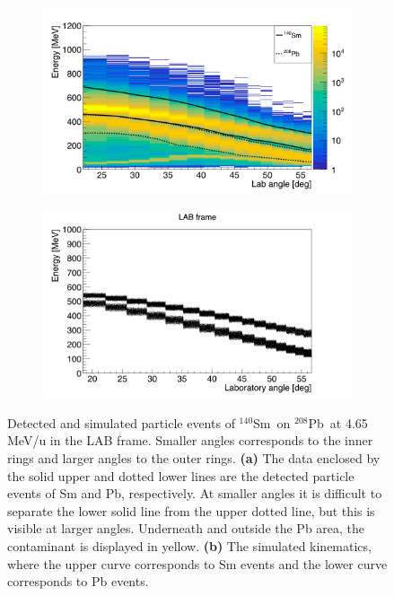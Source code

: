 \documentclass[twoside,english]{uiofysmaster/uiofysmaster}
\newcommand{\Sm}{$^{140}$Sm} %
\newcommand{\Pb}{$^{208}$Pb}
\begin{document}
\begin{figure}[htb]
	\centering
	\begin{subfigure}[t]{0.49\textwidth}
		\centering
		\includegraphics[width=\textwidth]{../Plots/plotting/particle-events-wcut.png}
		\caption{}
		\label{fig:part_wcut}
	\end{subfigure}
	\hfill 
	\begin{subfigure}[t]{0.49\textwidth}
		\centering
    		\includegraphics[width=\textwidth]{../Plots/simulation/kin_140Sm_208Pb.png}
		\caption{}
		\label{fig:kinsim}
	\end{subfigure}
	\caption{Detected and simulated particle events of \Sm\ on \Pb\ at 4.65 MeV/u in the LAB frame. Smaller angles corresponds to the inner rings and larger angles to the outer rings.
	\textbf{(a)} The data enclosed by the solid upper and dotted lower lines are the detected particle events of Sm and Pb, respectively. 
	At smaller angles it is difficult to separate the lower solid line from the upper dotted line, but this is visible at larger angles.
	Underneath and outside the Pb area, the contaminant is displayed in yellow.
	\textbf{(b)} The simulated kinematics, where the upper curve corresponds to Sm events and the lower curve corresponds to Pb events.
	}
	\label{fig:part_events}
\end{figure}
\end{document}
